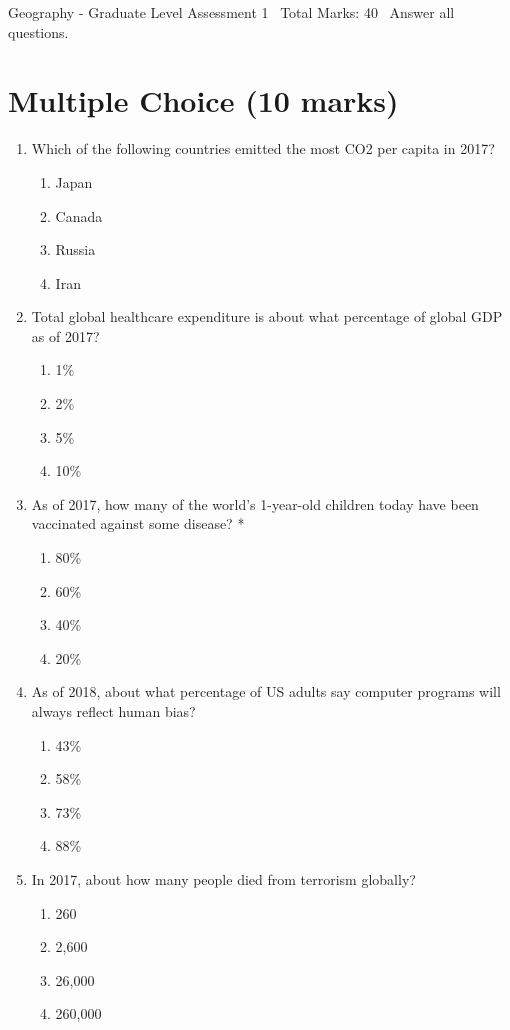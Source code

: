\documentclass[12pt]{article}
\begin{document}
\begin{center}
Geography - Graduate Level Assessment 1 \
Total Marks: 40 \
Answer all questions.
\end{center}

\section*{Multiple Choice (10 marks)}
\begin{enumerate}[label=\arabic*.]
\item Which of the following countries emitted the most CO2 per capita in 2017?
\begin{enumerate}[label=(\alph*)]
    \item Japan
    \item Canada
    \item Russia
    \item Iran
\end{enumerate}
\item Total global healthcare expenditure is about what percentage of global GDP as of 2017?
\begin{enumerate}[label=(\alph*)]
    \item 1\%
    \item 2\%
    \item 5\%
    \item 10\%
\end{enumerate}
\item As of 2017, how many of the world's 1-year-old children today have been vaccinated against some disease? *
\begin{enumerate}[label=(\alph*)]
    \item 80\%
    \item 60\%
    \item 40\%
    \item 20\%
\end{enumerate}
\item As of 2018, about what percentage of US adults say computer programs will always reflect human bias?
\begin{enumerate}[label=(\alph*)]
    \item 43\%
    \item 58\%
    \item 73\%
    \item 88\%
\end{enumerate}
\item In 2017, about how many people died from terrorism globally?
\begin{enumerate}[label=(\alph*)]
    \item 260
    \item 2,600
    \item 26,000
    \item 260,000
\end{enumerate}
\end{enumerate}
\end{document}
